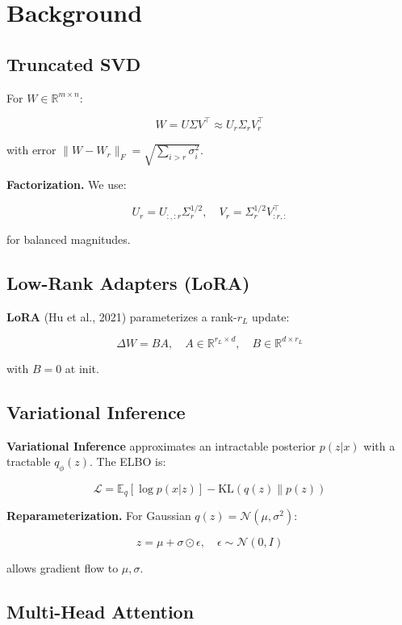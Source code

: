 \section{Background}

\subsection{Truncated SVD}

For $W \in \mathbb{R}^{m \times n}$:

\[
W = U \Sigma V^\top \approx U_r \Sigma_r V_r^\top
\tag{3.1}
\]

with error $\|W - W_r\|_F = \sqrt{\sum_{i > r} \sigma_i^2}$.

\textbf{Factorization.} We use:

\[
U_r = U_{:, :r} \Sigma_r^{1/2}, \quad V_r = \Sigma_r^{1/2} V_{:r, :}^\top
\tag{3.2}
\]

for balanced magnitudes.

\subsection{Low-Rank Adapters (LoRA)}

\textbf{LoRA} (Hu et al., 2021) parameterizes a rank-$r_L$ update:

\[
\Delta W = B A, \quad A \in \mathbb{R}^{r_L \times d}, \quad B \in \mathbb{R}^{d \times r_L}
\tag{3.3}
\]

with $B = 0$ at init.

\subsection{Variational Inference}

\textbf{Variational Inference} approximates an intractable posterior $p(z | x)$ 
with a tractable $q_\phi(z)$. The ELBO is:

\[
\mathcal{L} = \mathbb{E}_{q}[\log p(x | z)] - \text{KL}(q(z) \| p(z))
\tag{3.4}
\]

\textbf{Reparameterization.} For Gaussian $q(z) = \mathcal{N}(\mu, \sigma^2)$:

\[
z = \mu + \sigma \odot \epsilon, \quad \epsilon \sim \mathcal{N}(0, I)
\tag{3.5}
\]

allows gradient flow to $\mu, \sigma$.

\subsection{Multi-Head Attention}

